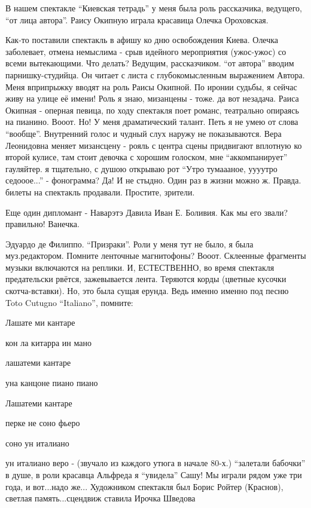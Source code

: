 В нашем спектакле \enquote{Киевская тетрадь} у меня была роль рассказчика, ведущего,
\enquote{от лица автора}. Раису Окипную играла красавица Олечка Ороховская.

Как-то поставили спектакль в афишу ко дню освобождения Киева. Олечка
заболевает, отмена немыслима - срыв идейного мероприятия (ужос-ужос) со всеми
вытекающими. Что делать? Ведущим, рассказчиком. \enquote{от автора} вводим
парнишку-студийца. Он читает с листа с глубокомысленным выражением Автора. Меня
вприпрыжку вводят на роль Раисы Окипной. По иронии судьбы, я сейчас живу на
улице её имени! Роль я знаю, мизанцены - тоже. да вот незадача. Раиса Окипная -
оперная певица, по ходу спектакля поет романс, театрально опираясь на пианино.
Вооот. Но! У меня драматический талант. Петь я не умею от слова \enquote{вообще}.
Внутренний голос и чудный слух наружу не показываются. Вера Леонидовна меняет
мизансцену - рояль с центра сцены придвигают вплотную ко второй кулисе, там
стоит девочка с хорошим голоском, мне \enquote{аккомпанирует} гауляйтер. я тщательно, с
душою открываю рот \enquote{Утро тумаааное, уууутро седооое...} - фонограмма? Да! И не
стыдно. Один раз в жизни можно ж. Правда. билеты на спектакль продавали.
Простите, зрители.

Еще один дипломант - Наварэтэ Давила Иван Е. Боливия. Как мы его звали?
правильно! Ванечка. 

Эдуардо де Филиппо. \enquote{Призраки}. Роли у меня тут не было, я была муз.редактором.
Помните ленточные магнитофоны? Вооот. Склеенные фрагменты музыки включаются на
реплики. И, ЕСТЕСТВЕННО, во время спектакля предательски рвётся, зажевывается
лента. Теряются корды (цветные кусочки скотча-вставки). Но, это была сущая
ерунда. Ведь именно именно под песню  Toto Cutugno \enquote{Italiano}, помните:

Лашате ми кантаре

кон ла китарра ин мано

лашатеми кантаре

уна канцоне пиано пиано

Лашатеми кантаре

перке не соно фьеро

соно ун италиано

ун италиано веро - (звучало из каждого утюга в начале 80-х.) \enquote{залетали
бабочки} в душе, в роли красавца Альфреда я \enquote{увидела} Сашу! Мы играли
рядом уже три года, и вот...надо же... Художником спектакля был Борис Ройтер
(Краснов), светлая память...сцендвиж ставила Ирочка Шведова

